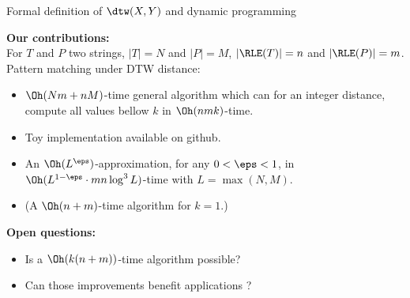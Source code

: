 \begin{frame}{Formal definition of $\dtw(X,Y)$ and dynamic programming}
  
  \end{frame}
  

\begin{frame}{}

  \textbf{Our contributions:}\\
  For $T$ and $P$ two strings, $|T|=N$ and  $|P|=M$, $|\RLE(T)|=n$ and  $|\RLE(P)|=m$.
  Pattern matching under DTW distance:
  \begin{itemize}
  \item $\Oh(Nm+nM)$-time general algorithm which can for an integer distance, compute all values bellow $k$ in $\Oh(nmk)$-time. \pause
  \item Toy implementation available on github.\pause
  \item An $\Oh(L^{\eps})$-approximation, for any $0 < \eps < 1$, in  $\Oh(L^{1-\eps} \cdot mn \log^3 L)$-time with $L=\max(N,M)$.\pause
  \item (A $\Oh(n+m)$-time algorithm for $k=1$.)\pause
  \end{itemize}
  
  
  \textbf{Open questions:}
  \begin{itemize}
  \item Is a $\Oh(k(n+m))$-time algorithm possible? \pause
  \item Can those improvements benefit applications ?\pause
  \end{itemize}
  \end{frame}


